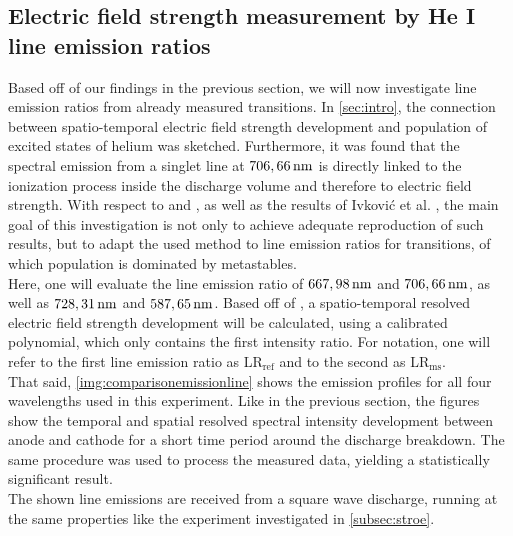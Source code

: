 \documentclass[a4paper,10pt,twoside]{article}
\newcommand{\ix}[1]{_\text{#1}}
\begin{document}
			\begin{multicols*}{2}
				
				\subsection{Electric field strength measurement by He I line emission ratios}
				
					Based off of our findings in the previous section, we will now investigate line emission ratios from already measured transitions. In \autoref{sec:intro}, the connection between spatio-temporal electric field strength development and population of excited states of helium was sketched. Furthermore, it was found that the spectral emission from a singlet line at $\unit[706,66]{nm}$ is directly linked to the ionization process inside the discharge volume and therefore to electric field strength. With respect to \cite{Massines} and \cite{0022-3727-36-1-306}, as well as the results of Ivkovi{\'c} et al. \cite{linratio1_14} \cite{lineratio2_14}, the main goal of this investigation is not only to achieve adequate reproduction of such results, but to adapt the used method to line emission ratios for transitions, of which population is dominated by metastables.\\
					Here, one will evaluate the line emission ratio of $\unit[667,98]{nm}$ and $\unit[706,66]{nm}$, as well as $\unit[728,31]{nm}$ and $\unit[587,65]{nm}$. Based off of \cite{linratio1_14}, a spatio-temporal resolved electric field strength development will be calculated, using a calibrated polynomial, which only contains the first intensity ratio. For notation, one will refer to the first line emission ratio as LR$\ix{ref}$ and to the second as LR$\ix{ms}$.\\
					That said, \autoref{img:comparisonemissionline} shows the emission profiles for all four wavelengths used in this experiment. Like in the previous section, the figures show the temporal and spatial resolved spectral intensity development between anode and cathode for a short time period around the discharge breakdown. The same procedure was used to process the measured data, yielding a statistically significant result.\\
					The shown line emissions are received from a square wave discharge, running at the same properties like the experiment investigated in \autoref{subsec:stroe}.
				
			\end{multicols*}
			
			\twocolumn
		
\end{document}

